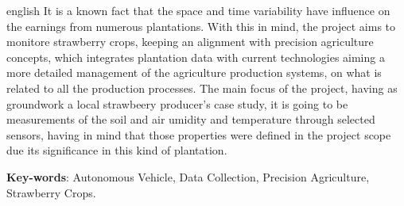 \begin{resumo}[Abstract]
 \begin{otherlanguage*}{english}
It is a known fact that the space and time variability have influence on the earnings from numerous plantations.
With this in mind, the project aims to monitore strawberry crops, keeping an alignment with precision agriculture concepts,
which integrates plantation data with current technologies aiming a more detailed management of the agriculture production
systems, on what is related to all the production processes.
The main focus of the project, having as groundwork a local strawbeery producer's case study, it is going to be measurements
of the soil and air umidity and temperature through selected sensors, having in mind that those properties were defined in
the project scope due its significance in this kind of plantation.
   \vspace{\onelineskip}

   \noindent
   \textbf{Key-words}: Autonomous Vehicle, Data Collection, Precision Agriculture, Strawberry Crops.
 \end{otherlanguage*}
\end{resumo}
